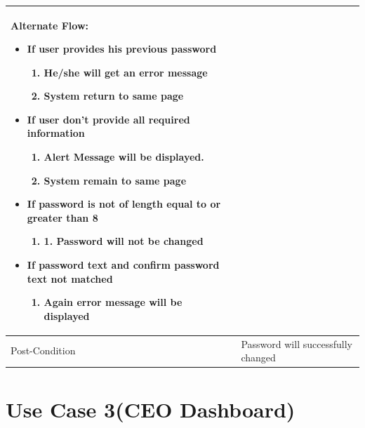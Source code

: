 \documentclass[12pt,a4paper]{report}
\begin{document}
\begin{tabular}{ | m{3cm} | m{12cm}| }
Alternate Flow:

\begin{itemize}
\item If user provides his previous password
	\begin{enumerate}
		\item	He/she will get an error message
		\item  System return to same page
	\end{enumerate}
\item If user don’t provide all required information
	\begin{enumerate}
	   	\item 	Alert Message will be displayed.
		\item 	System remain to same page
	\end{enumerate}
\item If password is not of length equal to or greater than 8
	\begin{enumerate}
		\item 	1.	Password will not be changed
	\end{enumerate}
\item If password text and confirm password text not matched
	\begin{enumerate}
		\item 	Again error message will be displayed
	\end{enumerate}
\end{itemize}
\\ \hline
Post-Condition &  Password will successfully changed  \\ \hline

\end{tabular}
\section{Use Case 3(CEO Dashboard)}
\end{document}
